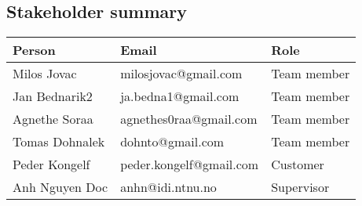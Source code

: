 \subsection{Stakeholder summary}
\begin{tabular}{l|l|l}
\textbf{Person} & \textbf{Email} & \textbf{Role}\\
\hline
Milos Jovac &  milosjovac@gmail.com & Team member  \\
Jan Bednarik2 &  ja.bedna1@gmail.com & Team member\\
Agnethe Soraa & agnethes0raa@gmail.com & Team member  \\
Tomas Dohnalek & dohnto@gmail.com & Team member \\
\hline
Peder Kongelf & peder.kongelf@gmail.com  & Customer\\
\hline
Anh Nguyen Doc	 & anhn@idi.ntnu.no & Supervisor \\
\hline

\end{tabular}

